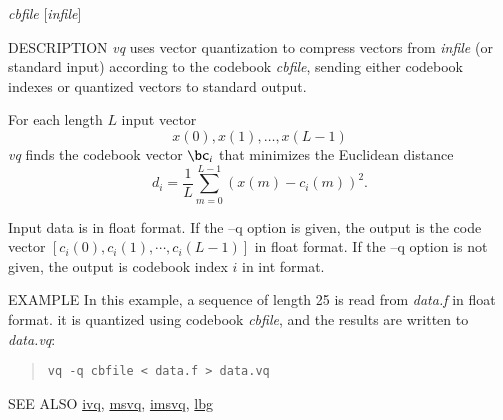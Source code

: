 \begin{synopsis}
\item [vq] [ --l $L$ ] [ --n $N$ ] [ --q ] {\em cbfile} [{\em infile}]
\end{synopsis}

\begin{qsection}{DESCRIPTION}
{\em vq} uses vector quantization to compress vectors 
from {\em infile} (or standard input)
according to the codebook {\em cbfile}, 
sending either codebook indexes or quantized vectors to standard output.

For each length $L$ input vector
\begin{displaymath}
  x(0),x(1),\dots,x(L-1)
\end{displaymath}
{\em vq} finds the codebook vector $\bc_i$ 
that minimizes the Euclidean distance
\begin{displaymath}
d_i = \frac{1}{L}\sum_{m=0}^{L-1} (x(m)-c_i(m))^2. 
\end{displaymath}

Input data is in float format.
If the --q option is given, 
the output is the code vector $[c_i(0), c_i(1), \cdots, c_i(L-1)]$ 
in float format.
If the --q option is not given, 
the output is codebook index $i$ in int format.
\end{qsection}

\begin{options}
\end{options}

\begin{qsection}{EXAMPLE}
In this example, a sequence of length 25 is read from {\em data.f}
in float format.
it is quantized using codebook {\em cbfile},
and the results are written to {\em data.vq}:
\begin{quote}
 \verb!vq -q cbfile < data.f > data.vq!
\end{quote} 
\end{qsection}

\begin{qsection}{SEE ALSO}
\hyperlink{ivq}{ivq},
\hyperlink{msvq}{msvq},
\hyperlink{imsvq}{imsvq},
\hyperlink{lbg}{lbg}
\end{qsection}
